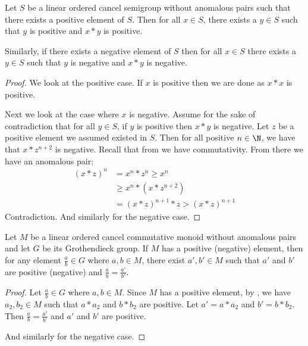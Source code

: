 \begin{theorem}\label{pos_large_elements}
    \leanok
    Let $S$ be a linear ordered cancel semigroup without anomalous pairs
    such that there exists a positive element of $S$.
    Then for all $x \in S$, there exists a $y \in S$
    such that $y$ is positive and $x*y$ is positive.

    Similarly, if there exists a negative element of $S$
    then for all $x \in S$ there exists a $y \in S$
    such that $y$ is negative and $x*y$ is negative.
\end{theorem}
\begin{proof}\leanok
We look at the positive case. If $x$ is positive then
we are done as $x*x$ is positive.

Next we look at the case where $x$ is negative.
Assume for the sake of contradiction that for all $y \in S$,
if $y$ is positive then $x*y$ is negative. Let $z$
be a positive element we assumed existed in $S$.
Then for all positive $n \in \N$, we have that
$x * z^{n+2}$ is negative. 
Recall that from  we have
commutativity.
From there we have an anomalous pair:
\begin{align*}
(x * z)^n &= x^n * z^n \ge x^n\\
&\ge x^n * (x * z^{n+2})\\
&= (x * z)^{n+1} * z > (x*z)^{n+1}
\end{align*}
Contradiction. And similarly for the negative case.
\end{proof}

\begin{theorem}\label{not_anom_pos_pair}
    \leanok
    Let $M$ be a linear ordered cancel commutative monoid
    without anomalous pairs and let $G$ be its Grothendieck group.
    If $M$ has a positive (negative) element, then
    for any element $\frac{a}{b} \in G$ where $a,b \in M$,
    there exist $a', b' \in M$ such that $a'$ and $b'$ are positive (negative)
    and $\frac{a}{b} = \frac{a'}{b'}$.
\end{theorem}
\begin{proof}\leanok
Let $\frac{a}{b}\in G$ where $a,b\in M$.
Since $M$ has a positive element, by ,
we have $a_2, b_2\in M$ such that $a*a_2$ and $b*b_2$ are positive.
Let $a' = a*a_2$ and $b' = b*b_2$. Then $\frac{a}{b} = \frac{a'}{b'}$
and $a'$ and $b'$ are positive.

And similarly for the negative case.
\end{proof}


